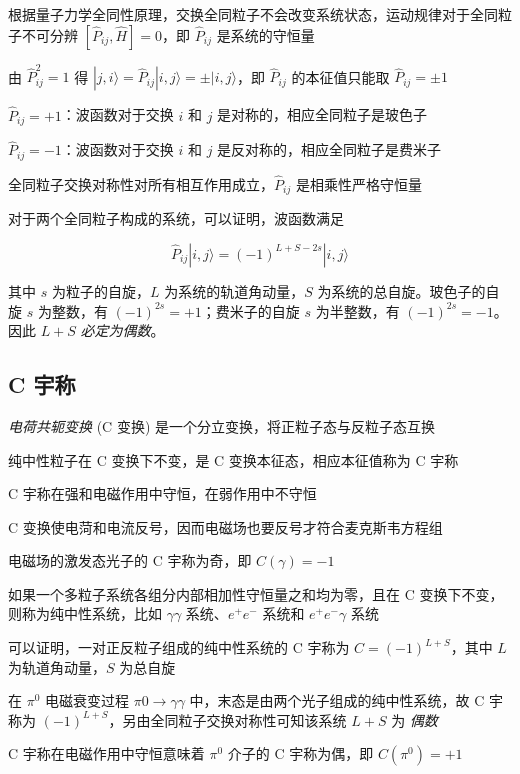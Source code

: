 根据量子力学全同性原理，交换全同粒子不会改变系统状态，运动规律对于全同粒子不可分辨 $[\hat{P}_{ij}, \hat{H}] = 0$，即 $\hat{P}_{ij}$ 是系统的守恒量

由 $\hat{P}_{ij}^2 = 1$ 得 $|j, i\rangle = \hat{P}_{ij} |i, j \rangle = \pm |i, j \rangle$，即 $\hat{P}_{ij}$ 的本征值只能取 $\hat{P}_{ij} = \pm 1$

$\hat{P}_{ij} = +1$：波函数对于交换 $i$ 和 $j$ 是对称的，相应全同粒子是玻色子

$\hat{P}_{ij} = -1$：波函数对于交换 $i$ 和 $j$ 是反对称的，相应全同粒子是费米子

全同粒子交换对称性对所有相互作用成立，$\hat{P}_{ij}$ 是相乘性严格守恒量

对于两个全同粒子构成的系统，可以证明，波函数满足

\begin{equation}
    \hat{P}_{ij} |i, j\rangle = (-1)^{L+S-2s} |i, j \rangle
\end{equation}

其中 $s$ 为粒子的自旋，$L$ 为系统的轨道角动量，$S$ 为系统的总自旋。玻色子的自旋 $s$ 为整数，有 $(-1)^{2s} = +1$；费米子的自旋 $s$ 为半整数，有 $(-1)^{2s} = -1$。因此 $L+S$ \emph{必定为偶数}。

\subsection{C 宇称}

\emph{电荷共轭变换} (C 变换) 是一个分立变换，将正粒子态与反粒子态互换

纯中性粒子在 C 变换下不变，是 C 变换本征态，相应本征值称为 C 宇称

C 宇称在强和电磁作用中守恒，在弱作用中不守恒

C 变换使电菏和电流反号，因而电磁场也要反号才符合麦克斯韦方程组

电磁场的激发态光子的 C 宇称为奇，即 $C(\gamma) = -1$

如果一个多粒子系统各组分内部相加性守恒量之和均为零，且在 C 变换下不变，则称为纯中性系统，比如 $\gamma\gamma$ 系统、$e^+ e^-$ 系统和 $e^+ e^- \gamma$ 系统

可以证明，一对正反粒子组成的纯中性系统的 C 宇称为 $C = (-1)^{L+S}$，其中 $L$ 为轨道角动量，$S$ 为总自旋

在 $\pi^0$ 电磁衰变过程 $\pi0 \to \gamma\gamma$ 中，末态是由两个光子组成的纯中性系统，故 C 宇称为 $(-1)^{L+S}$，另由全同粒子交换对称性可知该系统 $L+S$ 为 \emph{偶数}

C 宇称在电磁作用中守恒意味着 $\pi^0$ 介子的 C 宇称为偶，即 $C(\pi^0) = +1$

